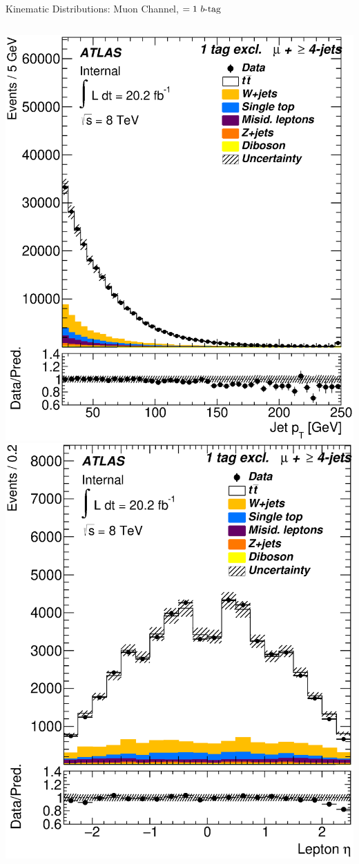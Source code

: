\documentclass{beamer}
\begin{document}
{\begin{frame}{Kinematic Distributions: Muon Channel, $=1\text{ } \lowercase{ b\text{-tag}}$}
\begin{columns}
      \includegraphics[width=.95\textwidth]{../chapters/whel/figures/control_Plots2/bTag_1excl/JetPt_mu}
      \includegraphics[width=.95\textwidth]{../chapters/whel/figures/control_Plots2/bTag_1excl/LeptonEta_mu}\\

\end{columns}
\end{frame}}
\end{document}
